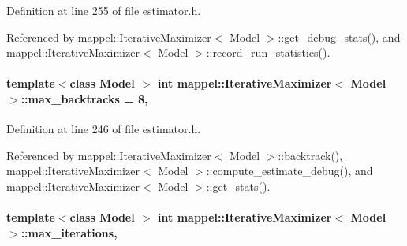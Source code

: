 Definition at line 255 of file estimator.\+h.



Referenced by mappel\+::\+Iterative\+Maximizer$<$ Model $>$\+::get\+\_\+debug\+\_\+stats(), and mappel\+::\+Iterative\+Maximizer$<$ Model $>$\+::record\+\_\+run\+\_\+statistics().

\paragraph[{\texorpdfstring{max\+\_\+backtracks}{max_backtracks}}]{\setlength{\rightskip}{0pt plus 5cm}template$<$class Model $>$ int {\bf mappel\+::\+Iterative\+Maximizer}$<$ Model $>$\+::max\+\_\+backtracks = 8\hspace{0.3cm}{\ttfamily [protected]}, {\ttfamily [inherited]}}\hypertarget{classmappel_1_1IterativeMaximizer_a72148f311140be63ded9794921a7c112}{}\label{classmappel_1_1IterativeMaximizer_a72148f311140be63ded9794921a7c112}


Definition at line 246 of file estimator.\+h.



Referenced by mappel\+::\+Iterative\+Maximizer$<$ Model $>$\+::backtrack(), mappel\+::\+Iterative\+Maximizer$<$ Model $>$\+::compute\+\_\+estimate\+\_\+debug(), and mappel\+::\+Iterative\+Maximizer$<$ Model $>$\+::get\+\_\+stats().

\paragraph[{\texorpdfstring{max\+\_\+iterations}{max_iterations}}]{\setlength{\rightskip}{0pt plus 5cm}template$<$class Model $>$ int {\bf mappel\+::\+Iterative\+Maximizer}$<$ Model $>$\+::max\+\_\+iterations\hspace{0.3cm}{\ttfamily [protected]}, {\ttfamily [inherited]}}\hypertarget{classmappel_1_1IterativeMaximizer_ac888935f332b069836a559f44cd267c7}{}\label{classmappel_1_1IterativeMaximizer_ac888935f332b069836a559f44cd267c7}


